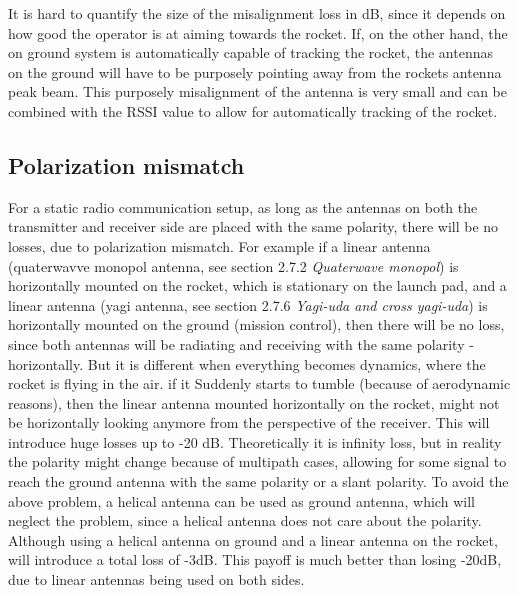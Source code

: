 It is hard to  quantify the size of the misalignment loss in dB, since it depends on how good the operator is at aiming towards the rocket. If, on the other hand, the on ground system is automatically capable of tracking the rocket, the antennas on the ground will have to be purposely pointing away from the rockets antenna peak beam. This purposely misalignment of the antenna is very small and can be combined with the RSSI value to allow for automatically tracking of the rocket. %

\subsection{Polarization mismatch}
For a static radio communication setup, as long as the antennas on both the transmitter and receiver side are placed with the same polarity, there will be no losses, due to polarization mismatch. For example if a linear antenna (quaterwavve monopol antenna, see section 2.7.2 \textit{Quaterwave monopol}) is horizontally mounted on the rocket, which is stationary on the launch pad, and a linear antenna (yagi antenna, see section 2.7.6 \textit{Yagi-uda and cross yagi-uda}) is horizontally mounted on the ground (mission control), then there will be no loss, since both antennas will be radiating and receiving with the same polarity - horizontally. But it is different when everything becomes dynamics, where the rocket is flying in the air. if it Suddenly starts to tumble (because of aerodynamic reasons), then the linear antenna mounted horizontally on the rocket, might not be horizontally looking anymore from the perspective of the receiver. This will introduce huge losses up to -20 dB. Theoretically it is infinity loss, but in reality the polarity might change because of multipath cases, allowing for some signal to reach the ground antenna with the same polarity or a slant polarity. To avoid the above problem, a helical antenna can be used as ground antenna, which will neglect the problem, since a helical antenna does not care about the polarity. Although using a helical antenna on ground and a linear antenna on the rocket, will introduce a total loss of -3dB. This payoff is much better than losing -20dB, due to linear antennas being used on both sides.   


